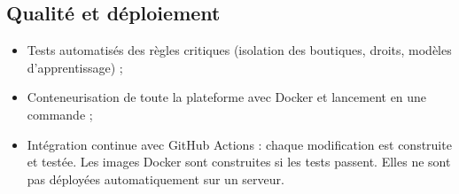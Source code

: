 \subsection{Qualité et déploiement}
\begin{itemize}
    \item Tests automatisés des règles critiques (isolation des boutiques, droits, modèles d'apprentissage) ;
    \item Conteneurisation de toute la plateforme avec Docker et lancement en une commande ;
    \item Intégration continue avec GitHub Actions : chaque modification est construite et testée. Les images Docker sont construites si les tests passent. Elles ne sont pas déployées automatiquement sur un serveur.
\end{itemize}

